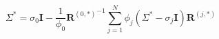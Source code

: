 \begin{displaymath}
\Sigma^\ast = \sigma_0\mathbf{I} - \frac{1}{\phi_0}{\mathbf{R}^{(0,\ast)}}^{-1} \sum_{j=1}^N \phi_j(\Sigma^\ast-\sigma_j\mathbf{I})\mathbf{R}^{(j,*)}
\label{eq:emt_berryman_update}
\end{displaymath}


